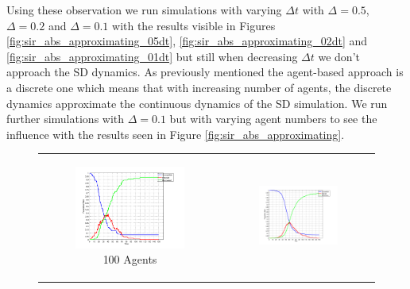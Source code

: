 Using these observation we run simulations with varying $\Delta t$ with $\Delta = 0.5$, $\Delta = 0.2$ and $\Delta = 0.1$ with the results visible in Figures \ref{fig:sir_abs_approximating_05dt}, \ref{fig:sir_abs_approximating_02dt} and \ref{fig:sir_abs_approximating_01dt} but still when decreasing $\Delta t$ we don't approach the SD dynamics. As previously mentioned the agent-based approach is a discrete one which means that with increasing number of agents, the discrete dynamics approximate the continuous dynamics of the SD simulation. We run further simulations with $\Delta = 0.1$ but with varying agent numbers to see the influence with the results seen in Figure \ref{fig:sir_abs_approximating}.

\begin{figure}
\begin{center}
	\begin{tabular}{c c}
		\begin{subfigure}[b]{0.3\textwidth}
			\centering
			\includegraphics[width=1\textwidth, angle=0]{./../shared/fig/frabs/SIR_100agents_150t_01dt_NOSS_parallel.png}
			\caption{100 Agents}
			\label{fig:sir_abs_approximating_100}
		\end{subfigure}
    	&
		\begin{subfigure}[b]{0.3\textwidth}
			\centering
			\includegraphics[width=1\textwidth, angle=0]{./../shared/fig/frabs/SIR_1000agents_150t_01dt_NOSS_parallel.png}

\end{subfigure}
\end{tabular}
\end{center}
\end{figure}
